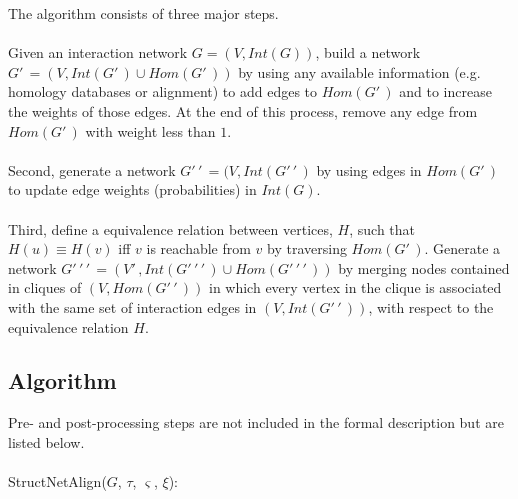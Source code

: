\documentclass[11pt]{article}
\begin{document}
The algorithm consists of three major steps.\\\\
Given an interaction network $G=(V,Int(G))$, build a network $G'\,\! = (V,Int(G'\,\!) \cup Hom(G'\,\!))$ by using any available information (e.g. homology databases or alignment) to add edges to $Hom(G'\,\!)$ and to increase the weights of those edges. At the end of this process, remove any edge from $Hom(G'\,\!)$ with  weight less than $1$.\\\\
Second, generate a network $G'\,\!'\,\! = (V, Int(G'\,\!'\,\!)$ by using edges in $Hom(G'\,\!)$ to update edge weights (probabilities) in $Int(G)$.\\\\
Third, define a equivalence relation between vertices, $H$, such that $H(u) \equiv H(v)$ iff $v$ is reachable from $v$ by traversing $Hom(G'\,\!)$. Generate a network $G'\,\!'\,\!'\,\! = (V'\,\!, Int(G'\,\!'\,\!'\,\!) \cup Hom(G'\,\!'\,\!'\,\!))$ by merging nodes contained in cliques of $(V,Hom(G'\,\!'\,\!))$ in which every vertex in the clique is associated with the same set of interaction edges in $(V, Int(G'\,\!'\,\!))$, with respect to the equivalence relation $H$.

\subsection*{Algorithm}

Pre- and post-processing steps are not included in the formal description but are listed below.\\\\
\newpage
StructNetAlign($G$, $\tau$, $\varsigma$, $\xi$):
\end{document}
